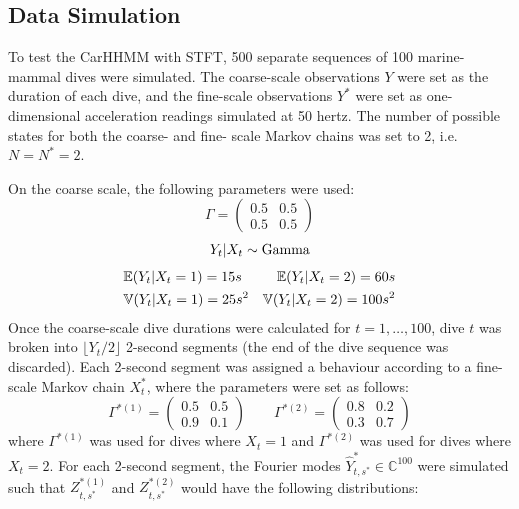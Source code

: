 \subsection{Data Simulation}

To test the CarHHMM with STFT, 500 separate sequences of 100 marine-mammal dives were simulated. The coarse-scale observations $Y$ were set as the duration of each dive, and the fine-scale observations $Y^*$ were set as one-dimensional acceleration readings simulated at 50 hertz. The number of possible states for both the coarse- and fine- scale Markov chains was set to 2, i.e. $N = N^* = 2$. 

On the coarse scale, the following parameters were used:
$$\Gamma = \begin{pmatrix} 0.5 & 0.5 \\ 0.5 & 0.5 \end{pmatrix} $$
$$Y_t|X_t \sim \rm{Gamma} $$
\begin{align*}
	&\mathbb{E}(Y_t|X_t = 1) = 15 s &\mathbb{E}(Y_t|X_t = 2) = 60 s \\
	&\mathbb{V}(Y_t|X_t = 1) = 25 s^2 &\mathbb{V}(Y_t|X_t = 2) = 100 s^2
\end{align*}
Once the coarse-scale dive durations were calculated for $t = 1, \ldots, 100$, dive $t$ was broken into $\lfloor Y_t/2 \rfloor$ 2-second segments (the end of the dive sequence was discarded). Each 2-second segment was assigned a behaviour according to a fine-scale Markov chain $X^*_t$, where the parameters were set as follows:
%
$$\Gamma^{*(1)} = \begin{pmatrix} 0.5 & 0.5 \\ 0.9 & 0.1 \end{pmatrix} \qquad 	\Gamma^{*(2)} = \begin{pmatrix} 0.8 & 0.2 \\ 0.3 & 0.7 \end{pmatrix}$$
%
where $\Gamma^{*(1)}$ was used for dives where $X_t = 1$ and $\Gamma^{*(2)}$ was used for dives where $X_t = 2$. For each 2-second segment, the Fourier modes $\hat{Y}^*_{t,s^*} \in \mathbb{C}^{100}$ were simulated such that $Z^{*(1)}_{t,s^*}$ and $Z^{*(2)}_{t,s^*}$ would have the following distributions: 

